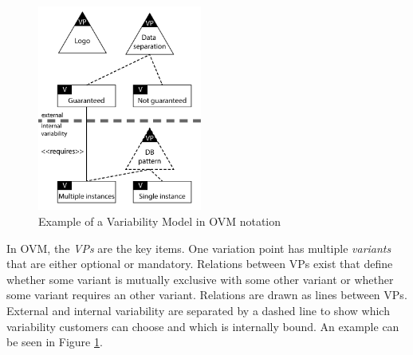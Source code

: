 \begin{compactitem}
\begin{figure}[htr]
    \centering
    \includegraphics[width=0.48\textwidth]{assets/OVM}
    \caption{Example of a Variability Model in \acs{OVM} notation~\cite{mietzner2009variability}}
    \label{fig:ovm}
\end{figure}

In \ac{OVM}, the \textit{\acp{VP}} are the key items. One variation point has multiple \textit{variants} that are either optional or mandatory. Relations between \acp{VP} exist that define whether some variant is mutually exclusive with some other variant or whether some variant requires an other variant. Relations are drawn as lines between \acp{VP}. External and internal variability are separated by a dashed line to show which variability customers can choose and which is internally bound. An example can be seen in Figure \ref{fig:ovm}.
\end{compactitem}


